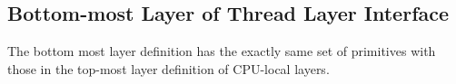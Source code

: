 
\subsection{Bottom-most Layer of Thread Layer Interface}
\label{chapter:certikos:subsec:phthread}

The bottom most layer definition has the exactly same set of primitives with those in 
the top-most layer definition of CPU-local layers. 

